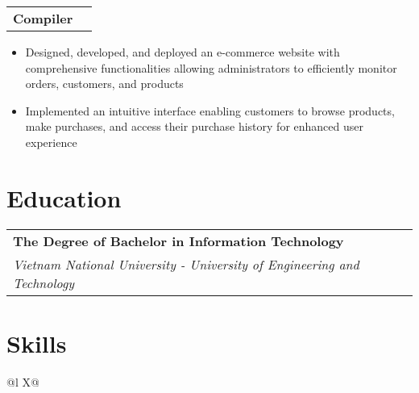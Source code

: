 \documentclass[a4paper,12pt]{article}
\begin{document}
\begin{tabularx}{\linewidth}{ @{}l r@{} }
    \textbf{Compiler} & \hfill \\[3.75pt]
\end{tabularx}
\begin{itemize}
    \item Designed, developed, and deployed an e-commerce website with comprehensive functionalities allowing administrators to efficiently monitor orders, customers, and products
    \item Implemented an intuitive interface enabling customers to browse products, make purchases, and access their purchase history for enhanced user experience
\end{itemize}

\section{Education}

\begin{tabularx}{\linewidth}{ @{}l r@{} }
    \textbf{The Degree of Bachelor in Information Technology} & \hfill \\[3.75pt]
    \textit{Vietnam National University - University of Engineering and Technology}
\end{tabularx}


\section{Skills}
\begin{tabularx}{\linewidth}{@{}l X@{}}
\end{tabularx}
\end{document}
